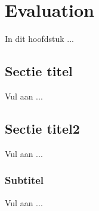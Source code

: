 \chapter{Evaluation}

In dit hoofdstuk ...

\section{Sectie titel}

Vul aan ...

\section{Sectie titel2}

Vul aan ...

\subsection{Subtitel}
Vul aan ...